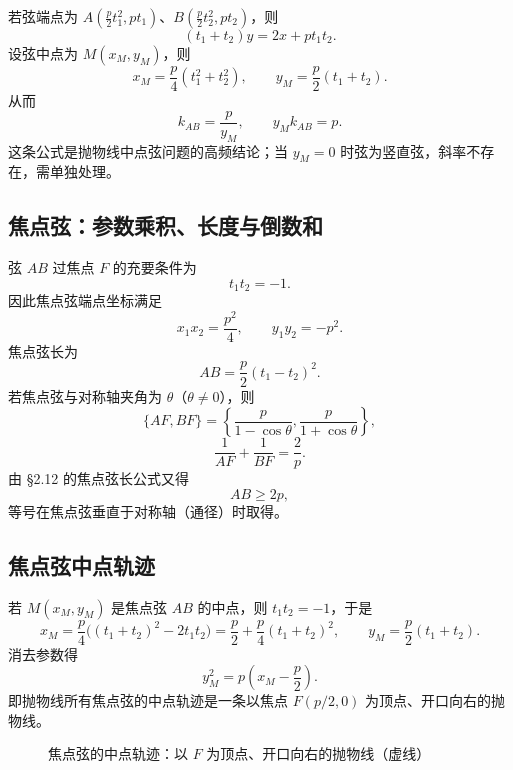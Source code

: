 \documentclass[UTF8,zihao=-4,a4paper]{ctexart}
\begin{document}
若弦端点为 $A(\frac p2t_1^2,pt_1)$、$B(\frac p2t_2^2,pt_2)$，则
\[
\boxed{(t_1+t_2)y=2x+pt_1t_2}.
\]
设弦中点为 $M(x_M,y_M)$，则
\[
x_M=\frac p4(t_1^2+t_2^2),\qquad y_M=\frac p2(t_1+t_2).
\]
从而
\[
\boxed{k_{AB}=\frac{p}{y_M}},\qquad
\boxed{y_Mk_{AB}=p}.
\]
这条公式是抛物线中点弦问题的高频结论；当 $y_M=0$ 时弦为竖直弦，斜率不存在，需单独处理。

\subsection{焦点弦：参数乘积、长度与倒数和}

弦 $AB$ 过焦点 $F$ 的充要条件为
\[
\boxed{t_1t_2=-1}.
\]
因此焦点弦端点坐标满足
\[
\boxed{x_1x_2=\frac{p^2}{4},\qquad y_1y_2=-p^2}.
\]
焦点弦长为
\[
\boxed{AB=\frac p2(t_1-t_2)^2}.
\]
若焦点弦与对称轴夹角为 $\theta$（$\theta\ne0$），则
\[
\boxed{\{AF,BF\}=\left\{\frac{p}{1-\cos\theta},\frac{p}{1+\cos\theta}\right\}},
\]
\[
\boxed{\frac1{AF}+\frac1{BF}=\frac2p}.
\]
由 §2.12 的焦点弦长公式又得
\[
\boxed{AB\ge2p},
\]
等号在焦点弦垂直于对称轴（通径）时取得。

\subsection{焦点弦中点轨迹}

若 $M(x_M,y_M)$ 是焦点弦 $AB$ 的中点，则 $t_1t_2=-1$，于是
\[
x_M=\frac p4\big((t_1+t_2)^2-2t_1t_2\big)
=\frac p2+\frac p4(t_1+t_2)^2,\qquad
y_M=\frac p2(t_1+t_2).
\]
消去参数得
\[
\boxed{y_M^2=p\left(x_M-\frac p2\right)}.
\]
即抛物线所有焦点弦的中点轨迹是一条以焦点 $F(p/2,0)$ 为顶点、开口向右的抛物线。

\begin{figure}[H]
\centering
{}
\caption{焦点弦的中点轨迹：以 $F$ 为顶点、开口向右的抛物线（虚线）}
\end{figure}
\end{document}
